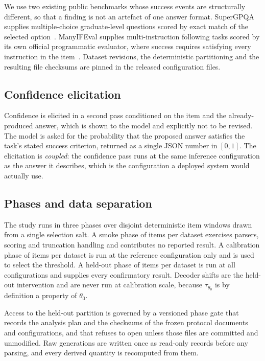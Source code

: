 \documentclass[information,article,submit,moreauthors]{Definitions/mdpi}
\begin{document}
We use two existing public benchmarks whose success events are structurally
different, so that a finding is not an artefact of one answer format. SuperGPQA
supplies multiple-choice graduate-level questions scored by exact match of the
selected option~\cite{supergpqacard}. ManyIFEval supplies multi-instruction
following tasks scored by its own official programmatic evaluator, where
success requires satisfying every instruction in the
item~\cite{harada2025manyifeval}. Dataset revisions, the deterministic
partitioning and the resulting file checksums are pinned in the released
configuration files.

\subsection{Confidence elicitation}

Confidence is elicited in a second pass conditioned on the item and the
already-produced answer, which is shown to the model and explicitly not to be
revised. The model is asked for the probability that the proposed answer
satisfies the task's stated success criterion, returned as a single JSON number
in $[0,1]$. The elicitation is \emph{coupled}: the confidence pass runs at the
same inference configuration as the answer it describes, which is the
configuration a deployed system would actually use.

\subsection{Phases and data separation}

The study runs in three phases over disjoint deterministic item windows drawn
from a single selection salt. A smoke phase of \NumSmokeItems{} items per
dataset exercises parsers, scoring and truncation handling and contributes no
reported result. A calibration phase of \NumCalibrationItems{} items per dataset
is run at the reference configuration only and is used to select the threshold. A
held-out phase of \NumHeldOutItems{} items per dataset is run at all
\NumCoordinates{} configurations and supplies every confirmatory result. Decoder
shifts are the held-out intervention and are never run at calibration scale,
because $\tau_{\theta_0}$ is by definition a property of $\theta_0$.

Access to the held-out partition is governed by a versioned phase gate that
records the analysis plan and the checksums of the frozen protocol documents and
configurations, and that refuses to open unless those files are committed and
unmodified. Raw generations are written once as read-only records before any
parsing, and every derived quantity is recomputed from them.
\end{document}
